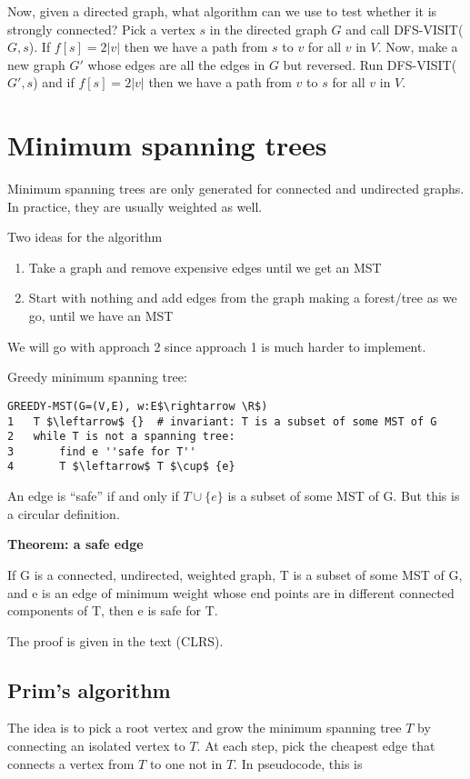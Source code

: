 \documentclass[11pt]{article}
\newcommand{\R}{\mathbb{R}}
\begin{document}
Now, given a directed graph, what algorithm can we use to test whether it is strongly connected? Pick a vertex $s$ in the directed graph $G$ and call DFS-VISIT($G,s$). If $f[s] = 2|v|$ then we have a path from $s$ to $v$ for all $v$ in $V$. Now, make a new graph $G'$ whose edges are all the edges in $G$ but reversed. Run DFS-VISIT($G',s$) and if $f[s] =2|v|$ then we have a path from $v$ to $s$ for all $v$ in $V$. 


\section{Minimum spanning trees}
Minimum spanning trees are only generated for connected and undirected graphs. In practice, they are usually weighted as well. 

Two ideas for the algorithm 
\begin{enumerate}
    \item Take a graph and remove expensive edges until we get an MST
    \item Start with nothing and add edges from the graph making a forest/tree as we go, until we have an MST
\end{enumerate}
We will go with approach 2 since approach 1 is much harder to implement. 

Greedy minimum spanning tree: 
\begin{lstlisting}
GREEDY-MST(G=(V,E), w:E$\rightarrow \R$)
1   T $\leftarrow$ {}  # invariant: T is a subset of some MST of G
2   while T is not a spanning tree: 
3       find e ''safe for T''
4       T $\leftarrow$ T $\cup$ {e}
\end{lstlisting}
An edge is ``safe'' if and only if $T \cup \{e\}$ is a subset of some MST of G. But this is a circular definition. 

\textbf{Theorem: a safe edge}

If G is a connected, undirected, weighted graph, T is a subset of some MST of G, and e is an edge of minimum weight whose end points are in different connected components of T, then e is safe for T. 

The proof is given in the text (CLRS).

\subsection{Prim's algorithm}

The idea is to pick a root vertex and grow the minimum spanning tree $T$ by connecting an isolated vertex to $T$. At each step, pick the cheapest edge that connects a vertex from $T$ to one not in $T$. In pseudocode, this is
\end{document}
